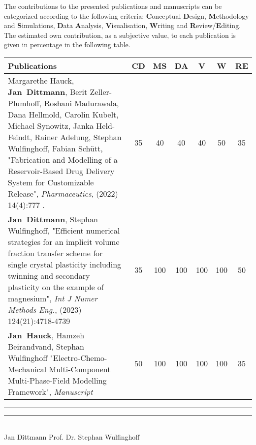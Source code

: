 The contributions to the presented publications and manuscripts can be categorized according to the following criteria: \textbf{C}onceptual \textbf{D}esign, \textbf{M}ethodology and \textbf{S}imulations, \textbf{D}ata \textbf{A}nalysis, \textbf{V}isualisation, \textbf{W}riting and \textbf{R}eview/\textbf{E}diting. The estimated own contribution, as a subjective value, to each publication is given in percentage in the following table.


	\begin{xltabular}{\textwidth}{| L | c | c | c | c | c | c |}
	\hline    
		\textbf{Publications} & \textbf{CD} & \textbf{MS} & \textbf{DA} & \textbf{V} & \textbf{W} & \textbf{RE}\tabularnewline 
		\hline    
Margarethe Hauck, \mbox{\textbf{Jan Dittmann}}, Berit Zeller-Plumhoff, Roshani Madurawala, Dana Hellmold,  Carolin Kubelt, Michael Synowitz, Janka Held-Feindt, Rainer Adelung, Stephan Wulfinghoff, Fabian Schütt, "Fabrication and Modelling of a Reservoir-Based Drug Delivery System for Customizable Release", \textit{Pharmaceutics}, (2022) 14(4):777 .&35&40&40&40&50&35\tabularnewline \hline
\mbox{\textbf{Jan Dittmann}}, Stephan Wulfinghoff, "Efficient numerical strategies for an implicit volume fraction transfer scheme for single crystal plasticity including twinning and secondary plasticity on the example of magnesium", \textit{Int J Numer Methods Eng.}, (2023) 124(21):4718-4739 & 35 & 100 & 100 & 100 & 100 & 50 \\ \hline
\mbox{\textbf{Jan Hauck}}, Hamzeh Beirandvand, Stephan Wulfinghoff "Electro-Chemo-Mechanical Multi-Component Multi-Phase-Field Modelling Framework", \textit{Manuscript} & 50 & 100 & 100 & 100 & 100 & 35 \\ \hline
\end{xltabular} 
\vspace{4cm}
\rule{5cm}{0.2pt} \hspace{4cm} \rule{5cm}{0.2pt}\\ 
\hspace*{1cm} Jan Dittmann \hspace{5.2cm} Prof. Dr. Stephan Wulfinghoff


